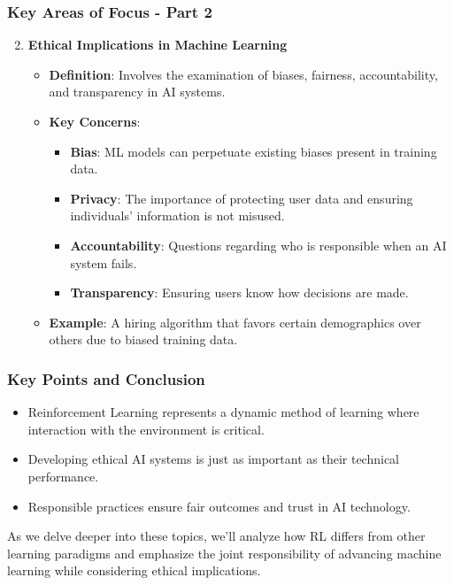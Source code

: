 \documentclass[aspectratio=169]{beamer}
\begin{document}
\begin{frame}[fragile]
    \frametitle{Key Areas of Focus - Part 2}

    \begin{enumerate}
        \setcounter{enumi}{1} %
        \item \textbf{Ethical Implications in Machine Learning}
            \begin{itemize}
                \item \textbf{Definition}: Involves the examination of biases, fairness, accountability, and transparency in AI systems.
                \item \textbf{Key Concerns}:
                    \begin{itemize}
                        \item \textbf{Bias}: ML models can perpetuate existing biases present in training data.
                        \item \textbf{Privacy}: The importance of protecting user data and ensuring individuals’ information is not misused.
                        \item \textbf{Accountability}: Questions regarding who is responsible when an AI system fails.
                        \item \textbf{Transparency}: Ensuring users know how decisions are made.
                    \end{itemize}
                \item \textbf{Example}: A hiring algorithm that favors certain demographics over others due to biased training data.
            \end{itemize}
    \end{enumerate}
\end{frame}

\begin{frame}[fragile]
    \frametitle{Key Points and Conclusion}

    \begin{itemize}
        \item Reinforcement Learning represents a dynamic method of learning where interaction with the environment is critical.
        \item Developing ethical AI systems is just as important as their technical performance.
        \item Responsible practices ensure fair outcomes and trust in AI technology.
    \end{itemize}

    As we delve deeper into these topics, we'll analyze how RL differs from other learning paradigms and emphasize the joint responsibility of advancing machine learning while considering ethical implications.
\end{frame}
\end{document}
